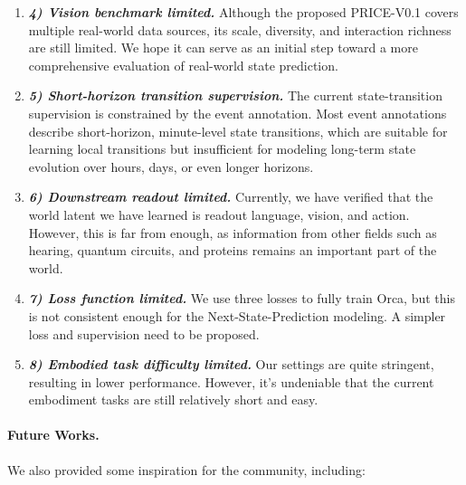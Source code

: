 \documentclass{llmxive}
\begin{document}
\begin{enumerate}[
    leftmargin=1.35em,
    itemsep=0.35em,
    topsep=0.35em,
    parsep=0em
]
    
    \item[] \textit{\textbf{4) Vision benchmark limited.}} 
    Although the proposed PRICE-V0.1 covers multiple real-world data sources, its scale, diversity, and interaction richness are still limited. We hope it can serve as an initial step toward a more comprehensive evaluation of real-world state prediction.


    \item[] \textit{\textbf{5) Short-horizon transition supervision.}}
    The current state-transition supervision is constrained by the event annotation. Most event annotations describe short-horizon, minute-level state transitions, which are suitable for learning local transitions but insufficient for modeling long-term state evolution over hours, days, or even longer horizons. 


    \item[] \textit{\textbf{6) Downstream readout limited.}} Currently, we have verified that the world latent we have learned is readout language, vision, and action. However, this is far from enough, as information from other fields such as hearing, quantum circuits, and proteins remains an important part of the world. 
    
    \item[] \textit{\textbf{7) Loss function limited.}} We use three losses to fully train Orca, but this is not consistent enough for the Next-State-Prediction modeling. A simpler loss and supervision need to be proposed.

    \item[] \textit{\textbf{8) Embodied task difficulty limited.}} Our settings are quite stringent, resulting in lower performance. However, it's undeniable that the current embodiment tasks are still relatively short and easy.

\end{enumerate}


\vspace{-0.5em}
\paragraph{Future Works.}
We also provided some inspiration for the community, including:
\end{document}
